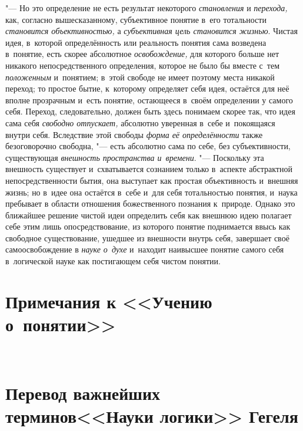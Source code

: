 "--- Но это определение не есть результат некоторого
{\em становления} и {\em перехода,} как,
согласно вышесказанному, субъективное понятие в~его тотальности
{\em становится объективностью,} а {\em субъективная цель
становится жизнью}. Чистая идея, в~которой определённость
или реальность понятия сама возведена в~понятие, есть скорее абсолютное
{\em освобождение,} для
которого больше нет никакого непосредственного определения, которое не было
бы вместе с~тем {\em положенным}
и~понятием; в~этой свободе не имеет поэтому места никакой
переход; то простое бытие, к~которому определяет себя идея, остаётся для
неё вполне прозрачным и~есть понятие, остающееся в~своём определении у
самого себя. Переход, следовательно, должен быть здесь понимаем скорее так,
что идея сама себя {\em свободно
отпускает,} абсолютно уверенная в~себе и~покоящаяся внутри
себя. Вследствие этой свободы {\em форма
её определённости} также безоговорочно свободна, "---
есть абсолютно сама по себе, без субъективности, существующая
{\em внешность пространства и~времени}.
"--- Поскольку эта внешность существует и~схватывается
сознанием только в~аспекте абстрактной непосредственности
бытия, она выступает как простая объективность и~внешняя жизнь; но в~идее
она остаётся в~себе и~для себя тотальностью понятия, и~наука пребывает в
области отношения божественного познания к~природе. Однако это ближайшее
решение чистой идеи определить себя как внешнюю идею полагает себе этим
лишь опосредствование, из которого понятие поднимается ввысь как свободное
существование, ушедшее из внешности внутрь себя, завершает своё
самоосвобождение в {\em науке о~духе}
и~находит наивысшее понятие самого себя в~логической науке
как постигающем себя чистом понятии.

\clearpage

\chapter[Примечания к <<Учению о~понятии>>]{Примечания к <<Учению о~понятии>>}

\printpagenotes

\clearpage\
\chapter[Перевод важнейших терминов <<Науки логики>> Гегеля]
{Перевод важнейших терминов\newline<<Науки логики>> Гегеля}

